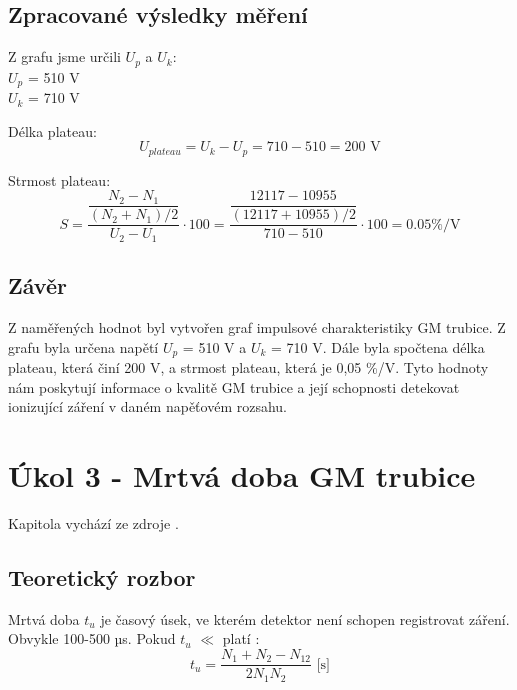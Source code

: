 \documentclass[fleqn]{protokol}
\begin{document}
    \subsection{Zpracované výsledky měření}

    Z grafu jsme určili $U_p$ a $U_k$:
    \\
    $U_p$ = 510 V\\
    $U_k$ = 710 V

    Délka plateau:
    \begin{equation}
        U_{plateau} = U_k - U_p = 710 - 510 = 200 \text{ V}
    \end{equation}

    Strmost plateau:
    \begin{equation}   
        S =  \dfrac{\dfrac{N_2-N_1}{(N_2+N_1)/2}}{U_2-U_1} \cdot 100 = \dfrac{\dfrac{12117-10955}{(12117+10955)/2}}{710-510} \cdot 100 = 0.05  \% / \text{V}
    \end{equation}

    
    \subsection{Závěr}
    Z naměřených hodnot byl vytvořen graf impulsové charakteristiky GM trubice. Z grafu byla určena napětí $U_p$ = 510 V a $U_k$ = 710 V. Dále byla spočtena délka plateau, která činí 200 V, a strmost plateau, která je 0,05 \%/V. Tyto hodnoty nám poskytují informace o kvalitě GM trubice a její schopnosti detekovat ionizující záření v daném napěťovém rozsahu.

\pagebreak

\section{Úkol 3 - Mrtvá doba GM trubice}
    Kapitola vychází ze zdroje \cite{navod}.
    \subsection{Teoretický rozbor}

    Mrtvá doba $t_u$ je časový úsek, ve kterém detektor není schopen registrovat záření. Obvykle 100-500 µs. Pokud $t_u$ $\ll$  platí \cite{navod}:
    \begin{equation}   
        t_u =  \dfrac{N_1+N_2-N_{12}}{2N_1N_2}  \text{     [s]}
    \end{equation}
\end{document}
